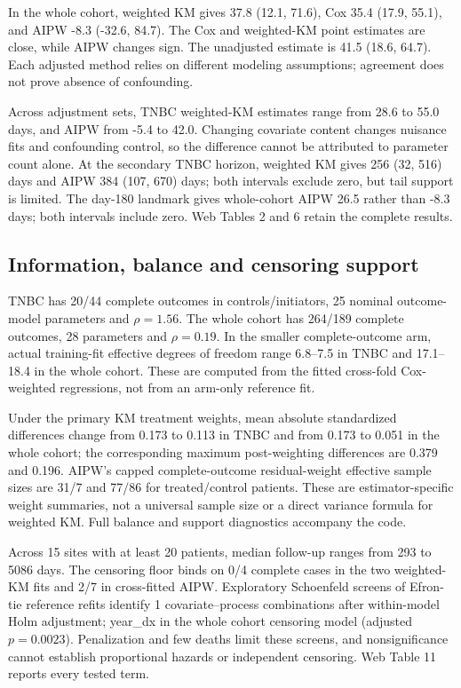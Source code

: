 \documentclass[12pt,letterpaper]{article}
\begin{document}
In the whole cohort, weighted KM gives 37.8 (12.1, 71.6),
Cox 35.4 (17.9, 55.1), and AIPW -8.3 (-32.6, 84.7).
The Cox and weighted-KM point estimates are close, while AIPW changes sign.
The unadjusted estimate is 41.5 (18.6, 64.7).
Each adjusted method relies on different modeling assumptions; agreement does not prove absence of confounding.

Across adjustment sets, TNBC weighted-KM estimates range from 28.6 to 55.0 days,
and AIPW from -5.4 to 42.0.
Changing covariate content changes nuisance fits and confounding control, so the difference cannot be
attributed to parameter count alone. At the secondary TNBC horizon, weighted KM gives 256 (32, 516) days
and AIPW 384 (107, 670) days; both intervals exclude zero, but tail support is limited.
The day-180 landmark gives whole-cohort AIPW 26.5 rather than -8.3 days;
both intervals include zero. Web Tables 2 and 6 retain the complete results.

\subsection{Information, balance and censoring support}
TNBC has 20/44 complete outcomes in controls/initiators,
25 nominal outcome-model parameters and $\rho=1.56$.
The whole cohort has 264/189 complete outcomes,
28 parameters and $\rho=0.19$.
In the smaller complete-outcome arm, actual training-fit effective degrees of freedom range
6.8--7.5 in TNBC and 17.1--18.4 in the whole cohort.
These are computed from the fitted cross-fold Cox-weighted regressions, not from an arm-only reference fit.

Under the primary KM treatment weights, mean absolute standardized differences change from
0.173 to 0.113 in TNBC and from 0.173 to 0.051
in the whole cohort; the corresponding maximum post-weighting differences are 0.379 and 0.196.
AIPW's capped complete-outcome residual-weight effective sample sizes are 31/7 and 77/86
for treated/control patients. These are estimator-specific weight summaries, not a universal sample size
or a direct variance formula for weighted KM. Full balance and support diagnostics accompany the code.

Across 15 sites with at least 20 patients, median follow-up ranges from 293 to 5086 days.
The censoring floor binds on 0/4 complete cases in the two weighted-KM fits
and 2/7 in cross-fitted AIPW.
Exploratory Schoenfeld screens of Efron-tie reference refits identify 1
covariate--process combinations after within-model Holm adjustment; year\_dx in the whole cohort censoring model (adjusted $p=0.0023$).
Penalization and few deaths limit these screens, and nonsignificance cannot establish proportional hazards
or independent censoring. Web Table 11 reports every tested term.
\end{document}

